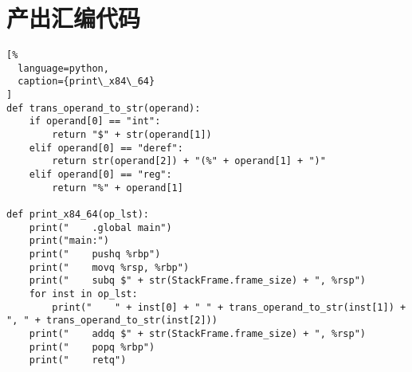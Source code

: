 \section{产出汇编代码}

\begin{lstlisting}[%
  language=python,
  caption={print\_x84\_64}
]
def trans_operand_to_str(operand):
    if operand[0] == "int":
        return "$" + str(operand[1])
    elif operand[0] == "deref":
        return str(operand[2]) + "(%" + operand[1] + ")"
    elif operand[0] == "reg":
        return "%" + operand[1]

def print_x84_64(op_lst):
    print("    .global main")
    print("main:")
    print("    pushq %rbp")
    print("    movq %rsp, %rbp")
    print("    subq $" + str(StackFrame.frame_size) + ", %rsp")
    for inst in op_lst:
        print("    " + inst[0] + " " + trans_operand_to_str(inst[1]) + ", " + trans_operand_to_str(inst[2]))
    print("    addq $" + str(StackFrame.frame_size) + ", %rsp")
    print("    popq %rbp")
    print("    retq")
\end{lstlisting}